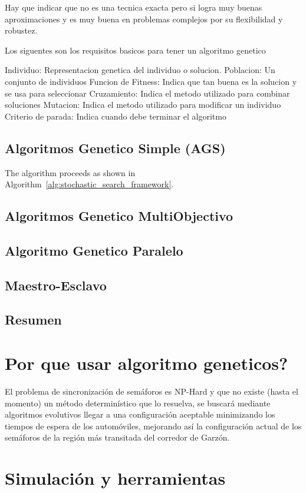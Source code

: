 Hay que indicar que no es una tecnica exacta pero si logra muy buenas aproximaciones y es muy buena en problemas complejos por su flexibilidad y robustez. 

Los siguentes son los requisitos basicos para tener un algoritmo genetico

Individuo: Representacion genetica del individuo o solucion.
Poblacion: Un conjunto de individuos
Funcion de Fitness: Indica que tan buena es la solucion y se usa para seleccionar
Cruzamiento: Indica el metodo utilizado para combinar soluciones
Mutacion: Indica el metodo utilizado para modificar un individuo
Criterio de parada: Indica cuando debe terminar el algoritmo

\subsection{Algoritmos Genetico Simple (AGS)}

The algorithm proceeds as shown in Algorithm~\ref{alg:stochastic_search_framework}.




\subsection{Algoritmos Genetico MultiObjectivo}
\subsection{Algoritmo Genetico Paralelo}
\subsection{Maestro-Esclavo}
\subsection{Resumen}

\section{Por que usar algoritmo geneticos?}
El problema de sincronización de semáforos es NP-Hard y que
no existe (hasta el momento) un método determinístico que lo
resuelva, se buscará mediante algoritmos evolutivos llegar a
una configuración aceptable minimizando los tiempos de
espera de los automóviles, mejorando así la configuración
actual de los semáforos de la región más transitada del corredor
de Garzón.


\section{Simulación y herramientas}
